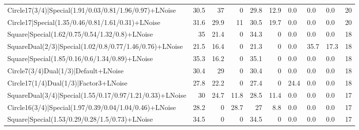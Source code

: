 \begin{tabular}{lrrrrrlllr}
 Circle17(3/4)|Special(1.91/0.03/0.81/1.96/0.97)+LNoise          &            30.5 &            37   &             0   &            29.8 &           12.9 & 0.0             & 0.0            & 0.0            &           20 \\
 Circle17|Special(1.35/0.46/0.81/1.61/0.31)+LNoise               &            31.6 &            29.9 &            11   &            30.5 &           19.7 & 0.0             & 0.0            & 0.0            &           20 \\
 Square|Special(1.62/0.75/0.54/1.32/0.8)+LNoise                  &            35   &            21.4 &             0   &            34.3 &            0   & 0.0             & 0.0            & 0.0            &           18 \\
 SquareDual(2/3)|Special(1.02/0.8/0.77/1.46/0.76)+LNoise         &            21.5 &            16.4 &             0   &            21.3 &            0   & 0.0             & 35.7           & 17.3           &           18 \\
 Square|Special(1.85/0.16/0.6/1.34/0.89)+LNoise                  &            35.3 &            16.2 &             0   &            35.1 &            0   & 0.0             & 0.0            & 0.0            &           18 \\
 Circle7(3/4)Dual(1/3)|Default+LNoise                            &            30.4 &            29   &             0   &            30.4 &            0   & 0.0             & 0.0            & 0.0            &           18 \\
 Circle17(1/4)Dual(1/3)|Factor3+LNoise                           &            27.8 &            22.2 &             0   &            27.4 &            0   & 24.4            & 0.0            & 0.0            &           18 \\
 SquareDual(3/4)|Special(1.55/0.17/0.97/1.21/0.33)+LNoise        &            30   &            24.7 &            11.8 &            28.5 &           11.4 & 0.0             & 0.0            & 0.0            &           17 \\
 Circle16(3/4)|Special(1.97/0.39/0.04/1.04/0.46)+LNoise          &            28.2 &             0   &            28.7 &            27   &            8.8 & 0.0             & 0.0            & 0.0            &           17 \\
 Square|Special(1.53/0.29/0.28/1.5/0.73)+LNoise                  &            34.5 &             0   &             0   &            34.5 &            0   & 0.0             & 0.0            & 0.0            &           17 \\

\end{tabular}
